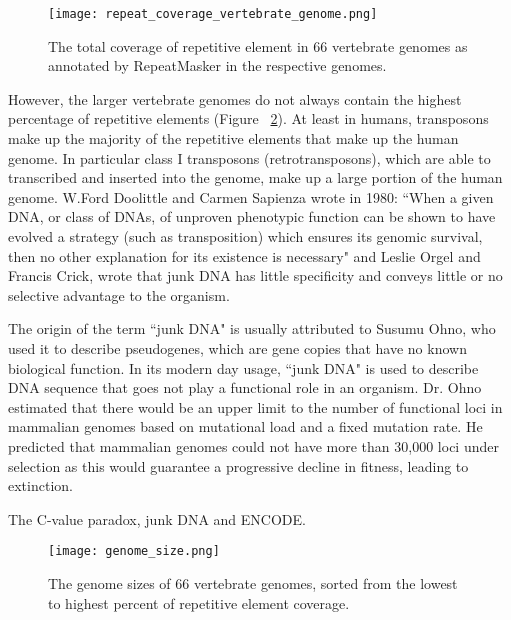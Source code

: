 \begin{figure}[!ht]
   \centering
   \texttt{[image: repeat\_coverage\_vertebrate\_genome.png]}
   \caption[Coverage of repetitive elements in vertebrate genomes]{The total coverage of repetitive element in 66 vertebrate genomes as annotated by RepeatMasker in the respective genomes\cite{tang2014repcoverage}.}
   \label{fig:repeat_coverage_vertebrate_genome}
\end{figure}

However, the larger vertebrate genomes do not always contain the highest percentage of repetitive elements (Figure ~\ref{fig:genome_size}). At least in humans, transposons make up the majority of the repetitive elements that make up the human genome. In particular class I transposons (retrotransposons), which are able to transcribed and inserted into the genome, make up a large portion of the human genome. W.Ford Doolittle and Carmen Sapienza wrote in 1980\cite{doolittle1980selfish}: ``When a given DNA, or class of DNAs, of unproven phenotypic function can be shown to have evolved a strategy (such as transposition) which ensures its genomic survival, then no other explanation for its existence is necessary" and Leslie Orgel and Francis Crick, wrote that junk DNA has little specificity and conveys little or no selective advantage to the organism\cite{orgel1980selfish}.

The origin of the term ``junk DNA" is usually attributed to Susumu Ohno, who used it to describe pseudogenes, which are gene copies that have no known biological function. In its modern day usage, ``junk DNA" is used to describe DNA sequence that goes not play a functional role in an organism. Dr. Ohno estimated that there would be an upper limit to the number of functional loci in mammalian genomes based on mutational load and a fixed mutation rate. He predicted that mammalian genomes could not have more than 30,000 loci under selection as this would guarantee a progressive decline in fitness, leading to extinction.

The C-value paradox, junk DNA and ENCODE\cite{Eddy2012}.

\begin{figure}[!ht]
   \centering
   \texttt{[image: genome\_size.png]}
   \caption[Vertebrate genomes sizes]{The genome sizes of 66 vertebrate genomes, sorted from the lowest to highest percent of repetitive element coverage\cite{tang2014gensize}.}
   \label{fig:genome_size}
\end{figure}

